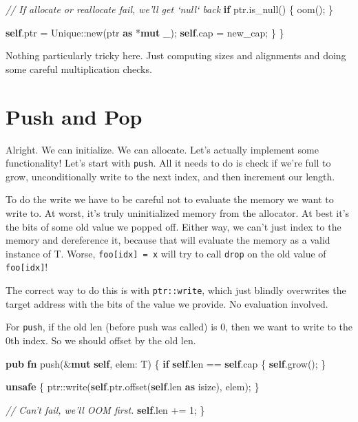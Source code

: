 \documentclass[a4paper,]{book}
\newenvironment{Shaded}{\begin{snugshade}}{\end{snugshade}}
\newcommand{\KeywordTok}[1]{\textcolor[rgb]{0.13,0.29,0.53}{\textbf{{#1}}}}
\newcommand{\DataTypeTok}[1]{\textcolor[rgb]{0.13,0.29,0.53}{{#1}}}
\newcommand{\DecValTok}[1]{\textcolor[rgb]{0.00,0.00,0.81}{{#1}}}
\newcommand{\CommentTok}[1]{\textcolor[rgb]{0.56,0.35,0.01}{\textit{{#1}}}}
\newcommand{\NormalTok}[1]{{#1}}
\begin{document}
\begin{Shaded}
\begin{Highlighting}[]
        \CommentTok{// If allocate or reallocate fail, we'll get `null` back}
        \KeywordTok{if} \NormalTok{ptr.is_null() \{ oom(); \}}

        \KeywordTok{self}\NormalTok{.ptr = Unique::new(ptr }\KeywordTok{as} \NormalTok{*}\KeywordTok{mut} \NormalTok{_);}
        \KeywordTok{self}\NormalTok{.cap = new_cap;}
    \NormalTok{\}}
\NormalTok{\}}
\end{Highlighting}
\end{Shaded}

Nothing particularly tricky here. Just computing sizes and alignments
and doing some careful multiplication checks.

\section{Push and Pop}\label{sec--vec-push-pop}

Alright. We can initialize. We can allocate. Let's actually implement
some functionality! Let's start with \texttt{push}. All it needs to do
is check if we're full to grow, unconditionally write to the next index,
and then increment our length.

To do the write we have to be careful not to evaluate the memory we want
to write to. At worst, it's truly uninitialized memory from the
allocator. At best it's the bits of some old value we popped off. Either
way, we can't just index to the memory and dereference it, because that
will evaluate the memory as a valid instance of T. Worse,
\texttt{foo{[}idx{]}\ =\ x} will try to call \texttt{drop} on the old
value of \texttt{foo{[}idx{]}}!

The correct way to do this is with \texttt{ptr::write}, which just
blindly overwrites the target address with the bits of the value we
provide. No evaluation involved.

For \texttt{push}, if the old len (before push was called) is 0, then we
want to write to the 0th index. So we should offset by the old len.

\begin{Shaded}
\begin{Highlighting}[]
\KeywordTok{pub} \KeywordTok{fn} \NormalTok{push(&}\KeywordTok{mut} \KeywordTok{self}\NormalTok{, elem: T) \{}
    \KeywordTok{if} \KeywordTok{self}\NormalTok{.len == }\KeywordTok{self}\NormalTok{.cap \{ }\KeywordTok{self}\NormalTok{.grow(); \}}

    \KeywordTok{unsafe} \NormalTok{\{}
        \NormalTok{ptr::write(}\KeywordTok{self}\NormalTok{.ptr.offset(}\KeywordTok{self}\NormalTok{.len }\KeywordTok{as} \DataTypeTok{isize}\NormalTok{), elem);}
    \NormalTok{\}}

    \CommentTok{// Can't fail, we'll OOM first.}
    \KeywordTok{self}\NormalTok{.len += }\DecValTok{1}\NormalTok{;}
\NormalTok{\}}
\end{Highlighting}
\end{Shaded}
\end{document}
